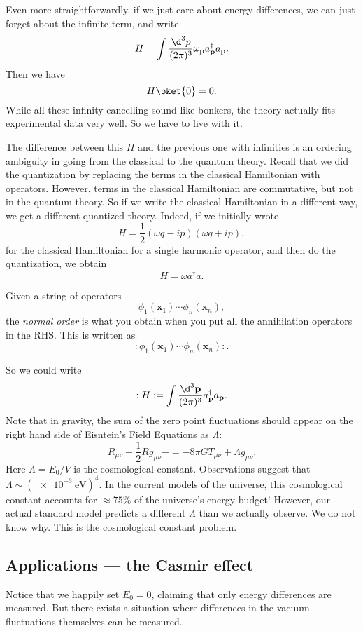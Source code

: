 \documentclass[a4paper]{article}
\begin{document}
Even more straightforwardly, if we just care about energy differences, we can just forget about the infinite term, and write
\[
  H = \int \frac{\d^3 p}{(2\pi)^3} \omega_\mathbf{p} a_\mathbf{p}^\dagger a_\mathbf{p}.
\]
Then we have
\[
  H \bket{0} = 0.
\]
While all these infinity cancelling sound like bonkers, the theory actually fits experimental data very well. So we have to live with it.

The difference between this $H$ and the previous one with infinities is an ordering ambiguity in going from the classical to the quantum theory. Recall that we did the quantization by replacing the terms in the classical Hamiltonian with operators. However, terms in the classical Hamiltonian are commutative, but not in the quantum theory. So if we write the classical Hamiltonian in a different way, we get a different quantized theory. Indeed, if we initially wrote
\[
  H = \frac{1}{2} (\omega q - ip)(\omega q + ip),
\]
for the classical Hamiltonian for a single harmonic operator, and then do the quantization, we obtain
\[
  H = \omega a^\dagger a.
\]
\begin{defi}
  Given a string of operators
  \[
    \phi_1(\mathbf{x}_1) \cdots \phi_n(\mathbf{x}_n),
  \]
  the \emph{normal order} is what you obtain when you put all the annihilation operators in the RHS. This is written as
  \[
    :\phi_1(\mathbf{x}_1) \cdots \phi_n(\mathbf{x}_n):.
  \]
\end{defi}
So we could write
\[
  :H: = \int \frac{\d^3 \mathbf{p}}{(2\pi)^3} a_\mathbf{p}^\dagger a_\mathbf{p}.
\]
Note that in gravity, the sum of the zero point fluctuations should appear on the right hand side of Eisntein's Field Equations as $\Lambda$:
\[
  R_{\mu\nu} - \frac{1}{2} R g_{\mu\nu} -= -8\pi GT_{\mu\nu} + \Lambda g_{\mu\nu}.
\]
Here $\Lambda = E_0/V$ is the cosmological constant. Observations suggest that $\Lambda \sim (\SI{e-3}{\electronvolt})^4$. In the current models of the universe, this cosmological constant accounts for $\approx 75\%$ of the universe's energy budget! However, our actual standard model predicts a different $\Lambda$ than we actually observe. We do not know why. This is the cosmological constant problem.

\subsection{Applications --- the Casmir effect}
Notice that we happily set $E_0 = 0$, claiming that only energy differences are measured. But there exists a situation where differences in the vacuum fluctuations themselves can be measured.
\end{document}
